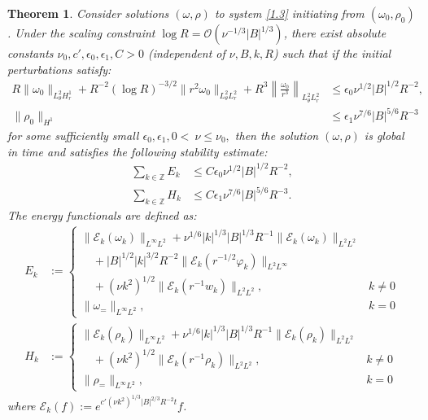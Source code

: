 \documentclass[final, 12pt,reqno]{amsart}
\newtheorem{theorem}{\bf Theorem}[section]
\numberwithin{equation}{section}
\begin{document}
\begin{theorem}\label{thm1}
Consider solutions $(\omega,\rho)$ to system \eqref{1.3} initiating from $(\omega_0,\rho_0)$. Under the scaling constraint $\log R = \mathcal{O}(\nu^{-1/3}|B|^{1/3})$, there exist absolute constants $\nu_0, c', \epsilon_0, \epsilon_1, C > 0$ (independent of $\nu, B, k, R$) such that if the initial perturbations satisfy:
\begin{align}
R\|\omega_0\|_{L_\theta^2 H_r^1} + R^{-2}(\log R)^{-3/2}\|r^2\omega_0\|_{L_\theta^2 L_r^2} + R^3\left\|\frac{\omega_0}{r^3}\right\|_{L_\theta^2 L_r^2} &\leq \epsilon_0 \nu^{1/2} |B|^{1/2} R^{-2}, \label{cond1} \\
\|\rho_0\|_{H^1} &\leq \epsilon_1 \nu^{7/6} |B|^{5/6} R^{-3} \label{cond2}
\end{align}
 for some sufficiently small $\epsilon_0,\epsilon_1,0<\ \nu\leq \nu_0 ,$ then the solution $(\omega,\rho)$ is global in time and satisfies the following stability estimate:
\begin{equation}
\begin{aligned}
\sum_{k \in \mathbb{Z}} E_k &\leq C \epsilon_0 \nu^{1/2} |B|^{1/2} R^{-2}, \\
\sum_{k \in \mathbb{Z}} H_k &\leq C \epsilon_1 \nu^{7/6} |B|^{5/6} R^{-3}.
\end{aligned}
\end{equation}
The energy functionals are defined as:
\begin{equation}
\begin{aligned}
E_k &:= \begin{cases} 
\|\mathcal{E}_k(\omega_k)\|_{L^\infty L^2} + \nu^{1/6}|k|^{1/3}|B|^{1/3} R^{-1} \|\mathcal{E}_k(\omega_k)\|_{L^2 L^2} & \\
\quad + |B|^{1/2}|k|^{3/2}R^{-2} \|\mathcal{E}_k(r^{-1/2}\varphi_k)\|_{L^2 L^\infty} & \\
\quad + (\nu k^2)^{1/2} \|\mathcal{E}_k(r^{-1} w_k)\|_{L^2 L^2}, & k \neq 0 \\
\|\omega_=\|_{L^\infty L^2}, & k = 0
\end{cases} \\
H_k &:= \begin{cases} 
\|\mathcal{E}_k(\rho_k)\|_{L^\infty L^2} + \nu^{1/6}|k|^{1/3}|B|^{1/3} R^{-1} \|\mathcal{E}_k(\rho_k)\|_{L^2 L^2} & \\
\quad + (\nu k^2)^{1/2} \|\mathcal{E}_k(r^{-1} \rho_k)\|_{L^2 L^2}, & k \neq 0 \\
\|\rho_=\|_{L^\infty L^2}, & k = 0
\end{cases}
\end{aligned}
\end{equation}
where $\mathcal{E}_k(f) := e^{c'(\nu k^2)^{1/3}|B|^{2/3} R^{-2} t} f$.
\end{theorem}
\end{document}
